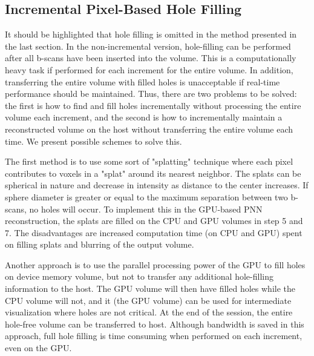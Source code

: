 \subsection{Incremental Pixel-Based Hole Filling}


It should be highlighted that hole filling is omitted in the method presented in the last section. In the non-incremental version, hole-filling can be performed after all b-scans have been inserted into the volume. This is a computationally heavy task if performed for each increment for the entire volume. In addition, transferring the entire volume with filled holes is unacceptable if real-time performance should be maintained. Thus, there are two problems to be solved: the first is how to find and fill holes incrementally without processing the entire volume each increment, and the second is how to incrementally maintain a reconstructed volume on the host without transferring the entire volume each time. We present possible schemes to solve this.

The first method is to use some sort of "splatting" technique where each pixel contributes to voxels in a "splat" around its nearest neighbor. The splats can be spherical in nature and decrease in intensity as distance to the center increases. If sphere diameter is greater or equal to the maximum separation between two b-scans, no holes will occur. To implement this in the GPU-based PNN reconstruction, the splats are filled on the CPU and GPU volumes in step 5 and 7. The disadvantages are increased computation time (on CPU and GPU) spent on filling splats and blurring of the output volume.

Another approach is to use the parallel processing power of the GPU to fill holes on device memory volume, but not to transfer any additional hole-filling information to the host. The GPU volume will then have filled holes while the CPU volume will not, and it (the GPU volume) can be used for intermediate visualization where holes are not critical. At the end of the session, the entire hole-free volume can be transferred to host. Although bandwidth is saved in this approach, full hole filling is time consuming when performed on each increment, even on the GPU.



